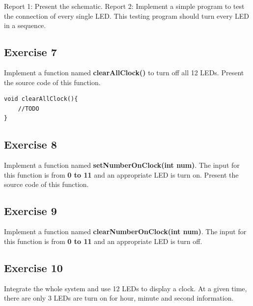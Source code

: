 Report 1: Present the schematic.
Report 2: Implement a simple program to test the connection of every single LED. This testing program should turn every LED in a sequence.

\subsection{Exercise 7}
Implement a function named \textbf{clearAllClock()} to turn off all 12 LEDs. Present the source code of this function.

\begin{lstlisting}[caption=Function Implementation]
void clearAllClock(){
    //TODO
}
\end{lstlisting}

\subsection{Exercise 8}
Implement a function named \textbf{setNumberOnClock(int num)}. The input for this function is from \textbf{0 to 11} and an appropriate LED is turn on. Present the source code of this function.

\subsection{Exercise 9}
Implement a function named \textbf{clearNumberOnClock(int num)}. The input for this function is from \textbf{0 to 11} and an appropriate LED is turn off. 

\subsection{Exercise 10}
Integrate the whole system and use 12 LEDs to display a clock. At a given time, there are only 3 LEDs are turn on for hour, minute and second information.
